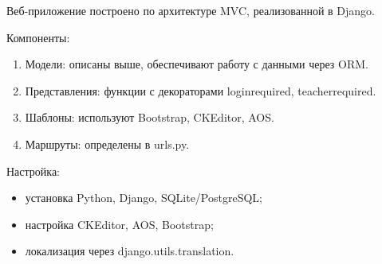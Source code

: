 Веб-приложение построено по архитектуре MVC, реализованной в Django.

Компоненты:
\begin{enumerate}
		\item Модели: описаны выше, обеспечивают работу с данными через ORM.
		\item Представления: функции с декораторами loginrequired, teacherrequired.
		\item Шаблоны: используют Bootstrap, CKEditor, AOS.
		\item Маршруты: определены в urls.py.
\end{enumerate}
		
Настройка:
\begin{itemize}
		\item установка Python, Django, SQLite/PostgreSQL;
		\item настройка CKEditor, AOS, Bootstrap;
		\item локализация через django.utils.translation.
\end{itemize}

